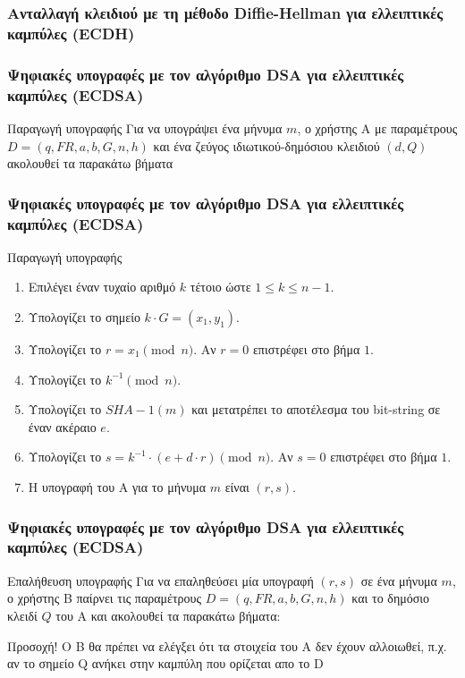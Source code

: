 \documentclass{beamer}
\begin{document}
%
\begin{frame}
\frametitle{Ανταλλαγή κλειδιού με τη μέθοδο Diffie-Hellman για ελλειπτικές καμπύλες (ECDH)}
\end{frame}

%
\begin{frame}
\frametitle{Ψηφιακές υπογραφές με τον αλγόριθμο DSA για ελλειπτικές καμπύλες (ECDSA)}
\begin{block}
{Παραγωγή υπογραφής}
Για να υπογράψει ένα μήνυμα $m$, ο χρήστης Α με παραμέτρους $D = (q, FR, a, b, G, n, h)$ και ένα ζεύγος ιδιωτικού-δημόσιου κλειδιού $(d, Q)$ ακολουθεί τα παρακάτω βήματα
\end{block}
\end{frame}

%
\begin{frame}
\frametitle{Ψηφιακές υπογραφές με τον αλγόριθμο DSA για ελλειπτικές καμπύλες (ECDSA)}
\begin{block}
{Παραγωγή υπογραφής}
\begin{small}
\begin{enumerate}
\item Επιλέγει έναν τυχαίο αριθμό $k$ τέτοιο ώστε $1 \leq k \leq n-1$.
\item Υπολογίζει το σημείο $k \cdot G = (x_1, y_1)$.
\item Υπολογίζει το $r = x_1 \pmod n$. Αν $r = 0$ επιστρέφει στο βήμα $1$.
\item Υπολογίζει το $k^{-1} \pmod n$.
\item Υπολογίζει το $SHA-1(m)$ και μετατρέπει το αποτέλεσμα του bit-string σε έναν ακέραιο $e$.
\item Υπολογίζει το $s = k^{-1} \cdot (e + d \cdot r) \pmod n$. Αν $s = 0$ επιστρέφει στο βήμα $1$.
\item Η υπογραφή του A για το μήνυμα $m$ είναι $(r,s)$.
\end{enumerate}
\end{small}
\end{block}
\end{frame}

%
\begin{frame}
\frametitle{Ψηφιακές υπογραφές με τον αλγόριθμο DSA για ελλειπτικές καμπύλες (ECDSA)}
\begin{block}
{Επαλήθευση υπογραφής}
Για να επαληθεύσει μία υπογραφή $(r,s)$ σε ένα μήνυμα $m$, ο χρήστης Β παίρνει τις παραμέτρους $D = (q, FR, a, b, G, n, h)$ και το δημόσιο κλειδί $Q$ του Α και ακολουθεί τα παρακάτω βήματα:
\end{block}
\alert{Προσοχή! Ο Β θα πρέπει να ελέγξει ότι τα στοιχεία του Α δεν έχουν αλλοιωθεί, π.χ. αν το σημείο Q ανήκει στην καμπύλη που ορίζεται απο το D}
\end{frame}
\end{document}
